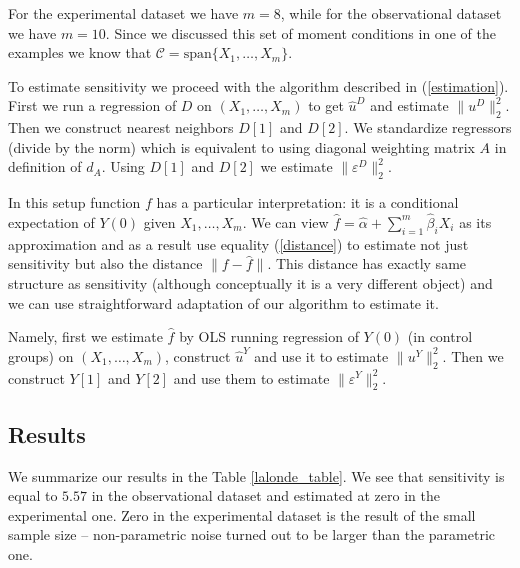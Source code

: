 \documentclass[12pt]{article}
\theoremstyle{plain}
\begin{document}
For the experimental dataset we have $m=8$, while for the observational dataset we have $m=10$. Since we discussed this set of moment conditions in one of the examples we know that $\mathcal{C} = \text{span}\{X_1,\dots, X_m\}$. 

To estimate sensitivity we proceed with the algorithm described in (\ref{estimation}). First we run a regression of $D$ on $(X_1,\dots, X_m)$ to get $\hat u^D$ and estimate $\|u^D\|^2_2$. Then we construct nearest neighbors $D[1]$ and $D[2]$. We standardize regressors (divide by the norm) which is equivalent to using diagonal weighting matrix $A$ in definition of $d_A$. Using $D[1]$ and $D[2]$ we estimate $\|\varepsilon^D \|^2_2$.

In this setup function $f$ has a particular interpretation: it is a conditional  expectation of $Y(0)$ given $X_1,\dots, X_m$. We can view $\hat f = \hat \alpha + \sum_{i=1}^m\hat \beta_i X_i$ as its approximation and as a result use equality (\ref{distance}) to estimate not just sensitivity but also the distance $\|f-\hat f\|$. This distance has exactly same structure as sensitivity (although conceptually it is a very different object) and we can use straightforward adaptation of our algorithm to estimate it. 

Namely, first we estimate $\hat f$ by OLS running regression of $Y(0)$ (in control groups) on $(X_1,\dots, X_m)$, construct $\hat u^Y$ and use it to estimate $\|u^Y\|_2^2$. Then we construct $Y[1]$ and $Y[2]$ and use them to estimate $\| \varepsilon^Y\|_2^2$.

\subsection{Results}
We summarize our results in the Table \ref{lalonde_table}. We see that sensitivity is equal to $5.57$ in the observational dataset and estimated at zero in the experimental one. Zero in the experimental dataset is the result of the small sample size -- non-parametric noise turned out to be larger than the parametric one. 
\end{document}
